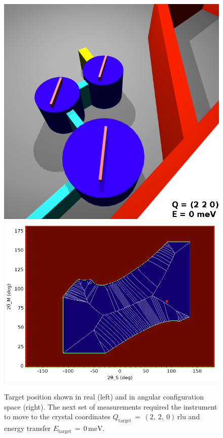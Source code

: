 \begin{figure}[H]
		\begin{center}
			\includegraphics[width = 0.4 \textwidth]{figures/casestudy_2_2_0_0meV}
			\hspace{0.5cm}
			\includegraphics[width = 0.55 \textwidth]{figures/casestudy_2_2_0_0meV_cfg}
		\end{center}
	\caption[Case study: Target position.]{Target position shown in real (left) and in angular configuration space (right). 
		The next set of measurements required the instrument
		to move to the crystal coordinates $Q_\mathrm{target}\,=\,\left(2,\ 2,\ 0\right)\, \mathrm{rlu}$ and 
		energy transfer $E_\mathrm{target}\,=\,0\, \mathrm{meV}$.
		\label{fig:casestudy_target}}
\end{figure}

